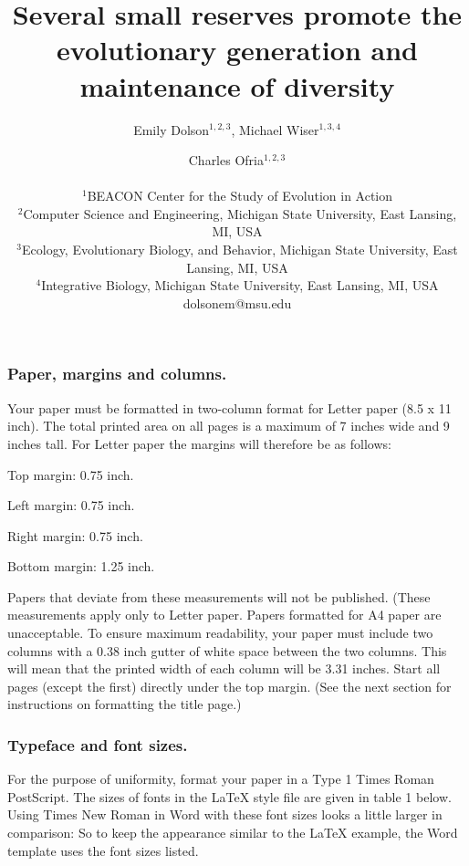 \documentclass[letterpaper]{article}
\title{Several small reserves promote the evolutionary generation and maintenance of diversity }
\author{Emily Dolson$^{1,2,3}$, Michael Wiser$^{1,3,4}$ \and Charles Ofria$^{1,2,3}$ \\
\mbox{}\\
$^1$BEACON Center for the Study of Evolution in Action  \\
$^2$Computer Science and Engineering, Michigan State University, East Lansing, MI, USA \\
$^3$Ecology, Evolutionary Biology, and Behavior, Michigan State University, East Lansing, MI, USA\\
$^4$Integrative Biology, Michigan State University, East Lansing, MI, USA\\
dolsonem@msu.edu}
\begin{document}
\subsubsection{Paper, margins and columns.} 	
Your paper must be formatted in two-column 
format for Letter paper (8.5 x 11 inch). The total printed area on all pages is 
a maximum of 7 inches wide and 9 inches tall. For Letter paper the margins 
will therefore be as follows:
\begin{itemize}
{\item Top margin: 0.75 inch.}
{\item Left margin: 0.75 inch.}
{\item Right margin: 0.75 inch.}
{\item Bottom margin: 1.25 inch.}
\end{itemize}
Papers that deviate from these measurements will not be published. 
(These measurements apply only to Letter paper. Papers formatted for A4 
paper are unacceptable.
To ensure maximum readability, your paper must include two columns 
with a 0.38 inch gutter of white space between the two columns. This 
will mean that the printed width of each column will be 3.31 inches. 
Start all pages (except the first) directly under the top margin. 
(See the next section for instructions on formatting the title page.) 

\subsubsection{Typeface and font sizes.}
For the purpose of uniformity, 
format your paper in a Type 1 Times Roman PostScript. 
The sizes of fonts in the LaTeX style file are given in table 1 below. 
Using Times New Roman in Word with these font sizes looks a little larger 
in comparison: So to keep the appearance similar to the LaTeX example, 
the Word template uses the font sizes listed. \\
\end{document}
